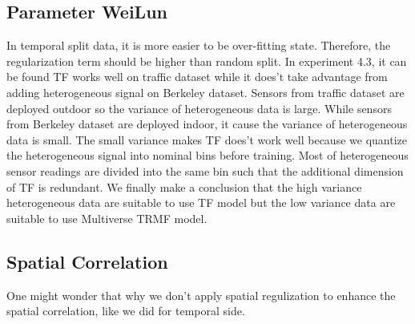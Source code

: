 \subsection{Parameter  WeiLun}
In temporal split data, it is more easier to be over-fitting state. Therefore, the regularization term should be higher than random split.
In experiment 4.3, it can be found TF works well on traffic dataset while it does't take advantage from adding heterogeneous signal on Berkeley dataset. Sensors from traffic dataset are deployed outdoor so the variance of heterogeneous data is large. While sensors from Berkeley dataset are deployed indoor, it cause the variance of heterogeneous data is small. The small variance makes TF does't work well because we quantize the heterogeneous signal into nominal bins before training. Most of heterogeneous sensor readings are divided into the same bin such that the additional dimension of TF is redundant.
We finally make a conclusion that the high variance heterogeneous data are suitable to use TF model but the low variance data are suitable to use Multiverse TRMF model. 

\subsection{Spatial Correlation}
One might wonder that why we don't apply spatial regulization to enhance the spatial correlation, like we did for temporal side.
